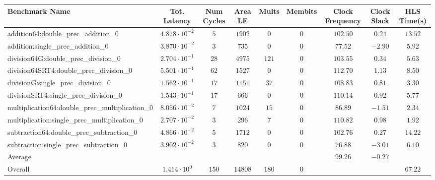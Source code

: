 \begin{tabular}{|l|c|c|c|c|c|c|c|c|}
\hline
Benchmark Name                                   & Tot. Latency            & Num Cycles & Area LE   & Mults   & Membits & Clock Frequency & Clock Slack & HLS Time(s) \\
\hline
addition64:double\_prec\_addition\_0             & $ 4.878 \cdot 10^{-2} $ & $ 5      $ & $ 1902  $ & $ 0   $ & $ 0   $ & $ 102.50      $ & $ 0.24    $ & $ 13.52   $ \\
addition:single\_prec\_addition\_0               & $ 3.870 \cdot 10^{-2} $ & $ 3      $ & $ 735   $ & $ 0   $ & $ 0   $ & $ 77.52       $ & $ -2.90   $ & $ 5.92    $ \\
division64G:double\_prec\_division\_0            & $ 2.704 \cdot 10^{-1} $ & $ 28     $ & $ 4975  $ & $ 121 $ & $ 0   $ & $ 103.55      $ & $ 0.34    $ & $ 5.63    $ \\
division64SRT4:double\_prec\_division\_0         & $ 5.501 \cdot 10^{-1} $ & $ 62     $ & $ 1527  $ & $ 0   $ & $ 0   $ & $ 112.70      $ & $ 1.13    $ & $ 8.50    $ \\
divisionG:single\_prec\_division\_0              & $ 1.562 \cdot 10^{-1} $ & $ 17     $ & $ 1151  $ & $ 37  $ & $ 0   $ & $ 108.83      $ & $ 0.81    $ & $ 3.30    $ \\
divisionSRT4:single\_prec\_division\_0           & $ 1.543 \cdot 10^{-1} $ & $ 17     $ & $ 666   $ & $ 0   $ & $ 0   $ & $ 110.14      $ & $ 0.92    $ & $ 5.77    $ \\
multiplication64:double\_prec\_multiplication\_0 & $ 8.056 \cdot 10^{-2} $ & $ 7      $ & $ 1024  $ & $ 15  $ & $ 0   $ & $ 86.89       $ & $ -1.51   $ & $ 2.34    $ \\
multiplication:single\_prec\_multiplication\_0   & $ 2.707 \cdot 10^{-2} $ & $ 3      $ & $ 296   $ & $ 7   $ & $ 0   $ & $ 110.82      $ & $ 0.98    $ & $ 1.92    $ \\
subtraction64:double\_prec\_subtraction\_0       & $ 4.866 \cdot 10^{-2} $ & $ 5      $ & $ 1712  $ & $ 0   $ & $ 0   $ & $ 102.76      $ & $ 0.27    $ & $ 14.22   $ \\
subtraction:single\_prec\_subtraction\_0         & $ 3.902 \cdot 10^{-2} $ & $ 3      $ & $ 820   $ & $ 0   $ & $ 0   $ & $ 76.88       $ & $ -3.01   $ & $ 6.10    $ \\
\hline
Average                                          & $                     $ & $        $ & $       $ & $     $ & $     $ & $ 99.26       $ & $ -0.27   $ & $         $ \\
\hline
Overall                                          & $ 1.414 \cdot 10^{0}  $ & $ 150    $ & $ 14808 $ & $ 180 $ & $ 0   $ & $             $ & $         $ & $ 67.22   $ \\
\hline
\end{tabular}

